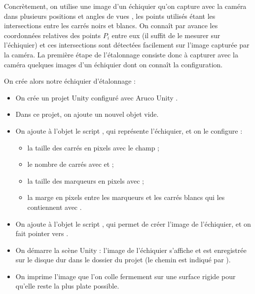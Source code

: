 
Concrètement, on utilise une image d'un échiquier qu'on capture avec la caméra dans plusieurs positions et angles de vues , les points utilisés étant les intersections entre les carrés noirs et blancs. On connaît par avance les coordonnées relatives des points $P_i$ entre eux (il suffit de le mesurer sur l'échiquier) et ces intersections sont détectées facilement sur l'image capturée par la caméra. La première étape de l'étalonnage consiste donc à capturer avec la caméra quelques images d'un échiquier dont on connaît la configuration.


On crée alors notre échiquier d'étalonnage  :
\begin{itemize}
  \item On crée un projet Unity configuré avec Aruco Unity .
  \item Dans ce projet, on ajoute un nouvel objet vide.
  \item On ajoute à l'objet le script , qui représente l'échiquier, et on le configure :
  \begin{itemize}
    \item la taille des carrés en pixels avec le champ  ;
    \item le nombre de carrés avec  et  ;
    \item la taille des marqueurs en pixels avec  ;
    \item la marge en pixels entre les marqueurs et les carrés blancs qui les contiennent avec .
  \end{itemize}
  \item On ajoute à l'objet le script , qui permet de créer l'image de l'échiquier, et on fait pointer  vers .
  \item On démarre la scène Unity : l'image de l'échiquier s'affiche et est enregistrée sur le disque dur dans le dossier du projet (le chemin est indiqué par ).
  \item On imprime l'image que l'on colle fermement sur une surface rigide pour qu'elle reste la plus plate possible.
\end{itemize}
\bigskip

